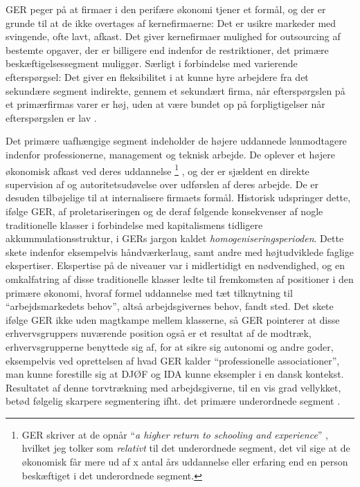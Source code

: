GER peger på at firmaer i den perifære økonomi tjener et formål, og der er grunde til at de ikke overtages af kernefirmaerne: Det er usikre markeder med svingende, ofte lavt, afkast. Det giver kernefirmaer mulighed for outsourcing af bestemte opgaver, der er billigere end indenfor de restriktioner, det primære beskæftigelsessegment muliggør. Særligt i forbindelse med varierende efterspørgsel: Det giver en fleksibilitet i at kunne hyre arbejdere fra det sekundære segment indirekte, gennem et sekundært firma, når efterspørgslen på et primærfirmas varer er høj, uden at være bundet op på forpligtigelser når efterspørgslen er lav \parencite[191]{Gordon1982}. 

Det primære uafhængige segment \label{GER kontrol og intern arb marked} indeholder de højere uddannede lønmodtagere indenfor professionerne, management og teknisk arbejde. De oplever et højere økonomisk afkast ved deres uddannelse%
% 
\footnote{GER skriver at de opnår “\emph{a higher return to schooling and experience}” \parencite[202]{Gordon1982}, hvilket jeg tolker som \emph{relativt} til det underordnede segment, det vil sige at de økonomisk får mere ud af x antal års uddannelse eller erfaring end en person beskæftiget i det underordnede segment.}%
%
, og der er sjældent en direkte supervision af og autoritetsudøvelse over udførslen af deres arbejde. De er desuden tilbøjelige til at internalisere firmaets formål. 
Historisk udspringer dette, ifølge GER, af proletariseringen og de deraf følgende konsekvenser af nogle traditionelle klasser i forbindelse med kapitalismens tidligere akkummulationsstruktur, i GERs jargon kaldet \emph{homogeniseringsperioden}.  Dette skete indenfor eksempelvis håndværkerlaug, samt andre med højtudviklede faglige ekspertiser. Ekspertise på de niveauer var i midlertidigt en nødvendighed, og en omkalfatring af disse traditionelle klasser ledte til fremkomsten af positioner i den primære økonomi, hvoraf formel uddannelse med tæt tilknytning til “arbejdsmarkedets behov”, altså arbejdsgivernes behov, fandt sted. Det skete  ifølge GER ikke uden magtkampe mellem klasserne, så GER pointerer at disse erhvervsgruppers nuværende position også er et resultat af de modtræk, erhvervsgrupperne benyttede sig af, for at sikre sig autonomi og andre goder, eksempelvis ved oprettelsen af hvad GER kalder “professionelle associationer”, man kunne forestille sig at DJØF og IDA kunne eksempler i en dansk kontekst. Resultatet af denne torvtrækning med arbejdsgiverne, til en vis grad vellykket, betød følgelig skarpere segmentering ifht. det primære underordnede segment \parencite[202f]{Gordon1982}.

